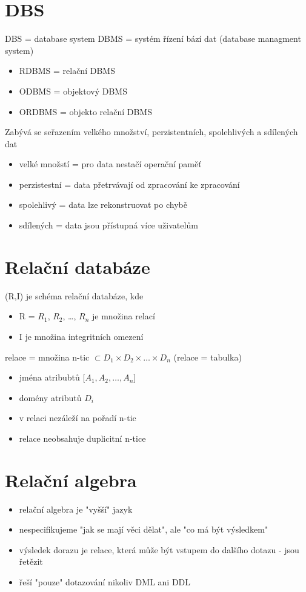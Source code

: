 \documentclass{szzclass}
\begin{document}
\tableofcontents
\newpage

\section{DBS}
DBS = database system \newline
DBMS = systém řízení bází dat (database managment system)
\begin{itemize}
  \item RDBMS = relační DBMS
  \item ODBMS = objektový DBMS
  \item ORDBMS = objekto relační DBMS
\end{itemize}

Zabývá se seřazením velkého množství, perzistentních, spolehlivých a sdílených dat
\begin{itemize}
  \item velké množstí = pro data nestačí operační paměť
  \item perzistestní = data přetrvávají od zpracování ke zpracování
  \item spolehlivý = data lze rekonstruovat po chybě
  \item sdílených = data jsou přístupná více uživatelům
\end{itemize}
\section{Relační databáze}
(R,I) je schéma relační databáze, kde
\begin{itemize}
  \item R = {$R_1$, $R_2$, \dots, $R_n$} je množina relací
  \item I je množina integritních omezení
\end{itemize}

relace = množina n-tic $\subset D_1 \times D_2 \times \dots \times D_n$ (relace = tabulka)
\begin{itemize}
  \item jména atribubtů [$A_1, A_2, \dots, A_n$]
  \item domény atributů $D_i$
  \item v relaci nezáleží na pořadí n-tic
  \item relace neobsahuje duplicitní n-tice
\end{itemize}
\section{Relační algebra}
\begin{itemize}
  \item relační algebra je "vyšší" jazyk
  \item nespecifikujeme "jak se mají věci dělat", ale "co má být výsledkem"
  \item výsledek dorazu je relace, která může být vstupem do dalšího dotazu - jsou řetězit
  \item řeší "pouze" dotazování nikoliv DML ani DDL
\end{itemize}
\end{document}
